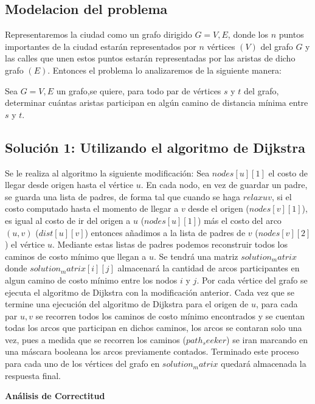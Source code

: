 \documentclass[
10pt, %
a4paper, %
oneside, %
headinclude,footinclude, %
BCOR5mm, %
]{scrartcl}
\begin{document}
\subsection{Modelacion del problema}

Representaremos la ciudad como un grafo dirigido $G = {V,E}$, donde los $n$ puntos importantes
de la ciudad estarán representados por $n$ vértices $(V)$ del grafo $G$ y las calles que unen estos 
puntos estarán representadas por las aristas de dicho grafo $(E)$. Entonces el problema lo analizaremos
de la siguiente manera:

Sea $G = {V,E}$ un grafo,se quiere, para todo par de vértices $s$ y $t$ del grafo, determinar cuántas aristas 
participan en algún camino de distancia mínima entre $s$ y $t$.

\subsection{Solución 1: Utilizando el algoritmo de Dijkstra}

Se le realiza al algoritmo la siguiente modificación: Sea $nodes[u][1]$ el
costo de llegar desde origen hasta el vértice $u$. En cada nodo, en vez de guardar un
padre, se guarda una lista de padres, de forma tal que cuando se haga $relax u v$,
si el costo computado hasta el momento de llegar a $v$ desde el origen ($nodes[v][1]$), es igual
al costo de ir del origen a $u$ ($nodes[u][1]$) más el costo del arco $(u, v)$ ($dist[u][v]$) entonces añadimos
a la lista de padres de $v$ ($nodes[v][2]$) el vértice $u$. Mediante estas listas de padres podemos
reconstruir todos los caminos de costo mínimo que llegan a $u$. Se tendrá una
matriz $solution_matrix$ donde $solution_matrix[i][j]$ almacenará la cantidad
de arcos participantes en algun camino de costo mínimo entre los nodos $i$ y $j$. Por cada vértice del grafo
se ejecuta el algoritmo de Dijkstra con la modificación anterior. Cada vez que se termine una ejecución del
algoritmo de Dijkstra para el origen de $u$, para cada par $u, v$ se recorren todos los caminos de costo mínimo
encontrados y se cuentan todas los arcos que participan en dichos caminos, los
arcos se contaran solo una vez, pues a medida que se recorren los caminos ($path_seeker$) se
iran marcando en una máscara booleana los arcos previamente contados. Terminado este proceso para cada uno de
los vértices del grafo en $solution_matrix$ quedará almacenada la respuesta final.


\textbf{Análisis de Correctitud}
\end{document}
